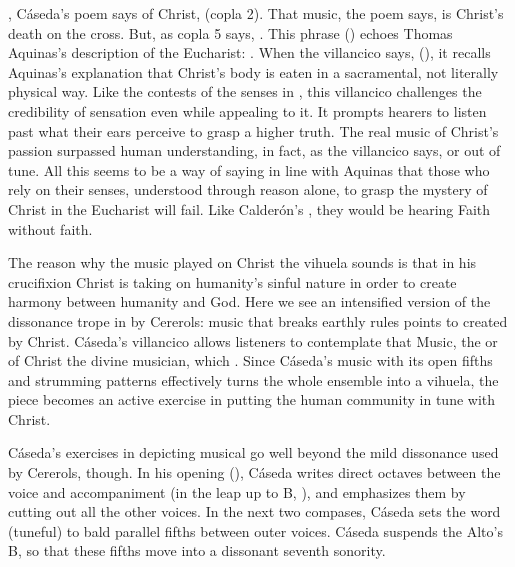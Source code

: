 , Cáseda's poem says of Christ,
 (copla 2).
That music, the poem says, is Christ's death on the cross.
But, as copla 5 says, .
This phrase () echoes Thomas Aquinas's
description of the Eucharist: .%
    \Autocite[question 75, article 1, ]{Aquinas:Summa3}
When the villancico says,  (),
it recalls Aquinas's explanation that Christ's body is eaten in a sacramental,
not literally physical way.
Like the contests of the senses in , this villancico
challenges the credibility of sensation even while appealing to it.
It prompts hearers to listen past what their ears perceive to grasp a higher
truth.
The real music of Christ's passion surpassed human understanding, in fact, as
the villancico says,  or out of tune.
All this seems to be a way of saying in line with Aquinas that those who rely
on their senses, understood through reason alone, to grasp the mystery of
Christ in the Eucharist will fail.
Like Calderón's , they would be hearing Faith without faith.


The reason why the music played on Christ the vihuela sounds  is
that in his crucifixion Christ is taking on humanity's sinful nature in order
to create harmony between humanity and God.
Here we see an intensified version of the dissonance trope in
 by Cererols: music that breaks earthly rules points
to  created by Christ.
Cáseda's villancico allows listeners to contemplate that Music, the
 or  of Christ the divine
musician, which .
Since Cáseda's music with its open fifths and strumming patterns effectively
turns the whole ensemble into a vihuela, the piece becomes an active exercise
in putting the human community in tune with Christ.

Cáseda's exercises in depicting musical  go well beyond the
mild dissonance used by Cererols, though.
In his opening (), Cáseda writes
direct octaves between the voice and accompaniment (in the leap up to B\fl,
), and emphasizes them by cutting out all the other voices.
In the next two compases, Cáseda sets the word  (tuneful) to
bald parallel fifths between outer voices.
Cáseda suspends the Alto's B\fl, so that these fifths move into a dissonant
seventh sonority.

